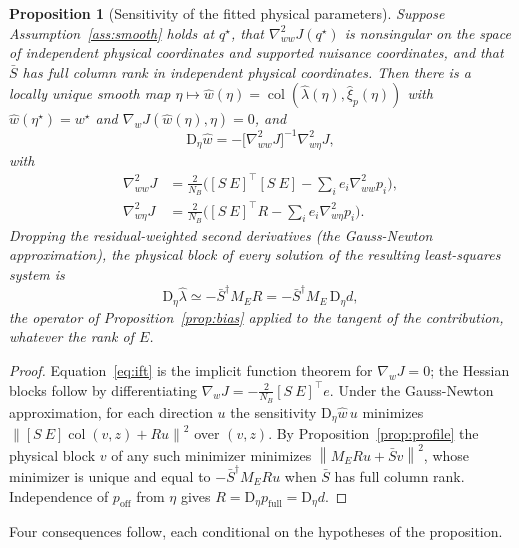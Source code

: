 \documentclass[11pt,a4paper]{article}
\newcommand{\D}{\mathrm D}
\newcommand{\col}{\operatorname{col}}
\newcommand{\norm}[1]{\left\lVert#1\right\rVert}
\newcommand{\full}{\mathrm{full}}
\newcommand{\off}{\mathrm{off}}
\newtheorem{proposition}{Proposition}[section]
\theoremstyle{remark}
\begin{document}
\begin{proposition}[Sensitivity of the fitted physical parameters]\label{prop:estimator}
Suppose Assumption~\ref{ass:smooth} holds at $q^\star$, that $\nabla^2_{ww}J(q^\star)$ is nonsingular on the space of independent physical coordinates and supported nuisance coordinates, and that $\bar S$ has full column rank in independent physical coordinates. Then there is a locally unique smooth map $\eta\mapsto\hat w(\eta)=\col(\hat\lambda(\eta),\hat\xi_p(\eta))$ with $\hat w(\eta^\star)=w^\star$ and $\nabla_wJ(\hat w(\eta),\eta)=0$, and
\begin{equation}\label{eq:ift}
 \D_\eta\hat w=-\big[\nabla^2_{ww}J\big]^{-1}\nabla^2_{w\eta}J,
\end{equation}
with
\begin{align}
 \nabla^2_{ww}J&=\tfrac{2}{N_B}\Big([S\ E]^\top[S\ E]-\textstyle\sum_ie_i\nabla^2_{ww}p_i\Big),\label{eq:hess-ww}\\
 \nabla^2_{w\eta}J&=\tfrac{2}{N_B}\Big([S\ E]^\top R-\textstyle\sum_ie_i\nabla^2_{w\eta}p_i\Big).\label{eq:hess-weta}
\end{align}
Dropping the residual-weighted second derivatives (the Gauss-Newton approximation), the physical block of every solution of the resulting least-squares system is
\begin{equation}\label{eq:gn-sensitivity}
 \D_\eta\hat\lambda\simeq-\bar S^\dagger M_ER=-\bar S^\dagger M_E\,\D_\eta d ,
\end{equation}
the operator of Proposition~\ref{prop:bias} applied to the tangent of the contribution, whatever the rank of $E$.
\end{proposition}
\begin{proof}
Equation~\eqref{eq:ift} is the implicit function theorem for $\nabla_wJ=0$; the Hessian blocks follow by differentiating $\nabla_wJ=-\tfrac2{N_B}[S\ E]^\top e$. Under the Gauss-Newton approximation, for each direction $u$ the sensitivity $\D_\eta\hat w\,u$ minimizes $\norm{[S\ E]\col(v,z)+Ru}^2$ over $(v,z)$. By Proposition~\ref{prop:profile} the physical block $v$ of any such minimizer minimizes $\norm{M_ERu+\bar Sv}^2$, whose minimizer is unique and equal to $-\bar S^\dagger M_ERu$ when $\bar S$ has full column rank. Independence of $p_\off$ from $\eta$ gives $R=\D_\eta p_\full=\D_\eta d$.
\end{proof}
Four consequences follow, each conditional on the hypotheses of the proposition.
\end{document}
